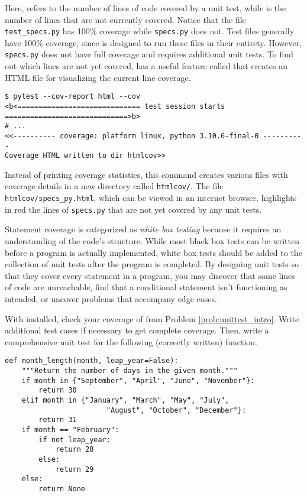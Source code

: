Here,  refers to the number of lines of code covered by a unit test, while  is the number of lines that are not currently covered.
Notice that the file \texttt{test\_specs.py} has 100\% coverage while \texttt{specs.py} does not.
Test files generally have 100\% coverage, since  is designed to run these files in their entirety.
However, \texttt{specs.py} does not have full coverage and requires additional unit tests.
To find out which lines are not yet covered,  has a useful feature called  that creates an HTML file for visualizing the current line coverage.

\begin{lstlisting}
$ pytest --cov-report html --cov
<b<============================= test session starts =============================>b>
# ...
<<---------- coverage: platform linux, python 3.10.6-final-0 ----------
Coverage HTML written to dir htmlcov>>
\end{lstlisting}

Instead of printing coverage statistics, this command creates various files with coverage details in a new directory called \texttt{htmlcov/}.
The file \texttt{htmlcov/specs\_py.html}, which can be viewed in an internet browser, highlights in red the lines of \texttt{specs.py} that are not yet covered by any unit tests.

\begin{info} %
Statement coverage is categorized as \emph{white box testing} because it requires an understanding of the code's structure.
While most black box tests can be written before a program is actually implemented, white box tests should be added to the collection of unit tests after the program is completed.
By designing unit tests so that they cover every statement in a program, you may discover that some lines of code are unreachable, find that a conditional statement isn't functioning as intended, or uncover problems that accompany edge cases.
\end{info}

\begin{problem} %
With  installed, check your coverage of  from Problem \ref{prob:unittest_intro}.
Write additional test cases if necessary to get complete coverage.
Then, write a comprehensive unit test for the following (correctly written) function.

\begin{lstlisting}
def month_length(month, leap_year=False):
    """Return the number of days in the given month."""
    if month in {"September", "April", "June", "November"}:
        return 30
    elif month in {"January", "March", "May", "July",
                        "August", "October", "December"}:
        return 31
    if month == "February":
        if not leap_year:
            return 28
        else:
            return 29
    else:
        return None
\end{lstlisting}
\end{problem}

